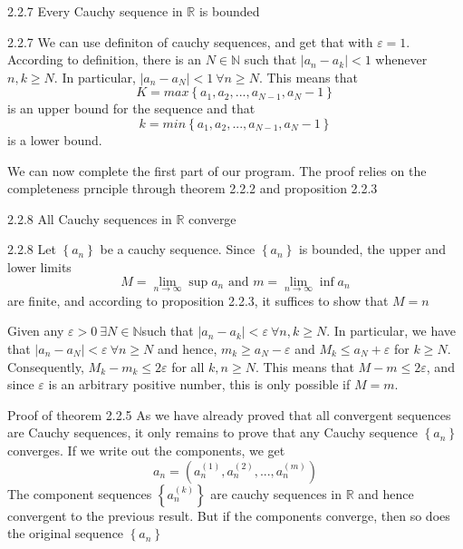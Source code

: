 \documentclass[a4paper,norsk]{article}
\renewcommand{\geq}{\geqslant}
\renewcommand{\leq}{\leqslant}
\renewcommand{\epsilon}{\varepsilon}
\begin{document}
\begin{lemmabox}{2.2.7}{}
Every Cauchy sequence in $ \mathbb{R} $ is bounded

\begin{proofbox}{2.2.7}{}
  We can use definiton of cauchy sequences, and get that with $ \epsilon =1 $. According to definition, there is an $ N \in \mathbb{N} $  such that $ \left| a_n - a_k  \right| < 1 $ whenever $ n, k \geq N $. In particular, $ \left| a_n - a_N \right| < 1 \: \forall n \geq N  $. This means that 
  \[
      K = max \left\{ a_1, a_2, ..., a_{N-1}, a_N -1  \right\} 
  \]
  is an upper bound for the sequence and that 
  \[
      k = min \left\{ a_1, a_2, ..., a_{N-1}, a_N -1  \right\} 
  \]
  is a lower bound.
  
\end{proofbox}
\end{lemmabox}

We can now complete the first part of our program. The proof relies on the completeness prnciple through theorem 2.2.2 and proposition 2.2.3

\begin{propositionbox}{2.2.8}{}
All Cauchy sequences in $ \mathbb{R} $ converge

\begin{proofbox}{2.2.8}{}
  Let $ \left\{ a_n \right\}  $ be a cauchy sequence. Since $ \left\{ a_n \right\}  $ is bounded, the upper and lower limits
  \[
      M = \lim_{n \to \infty } \sup a_n \text{ and } m = \lim_{n \to \infty } \inf a_n  
  \]
  are finite, and according to proposition 2.2.3, it suffices to show that $ M = n $
  
  Given any $ \epsilon >0 \: \exists N \in \mathbb{N} $such that $ \left| a_n - a_k \right| < \epsilon \: \forall n,k \geq N $. In particular, we have that $ \left| a_n - a_N \right| < \epsilon \: \forall n \geq N  $ and hence, $ m_k \geq a_N - \epsilon  $ and $ M_k \leq a_N + \epsilon  $   for $ k \geq N $. Consequently, $ M_k - m_k \leq 2 \epsilon  $ for all $ k,n \geq N $. This means that $ M - m \leq 2 \epsilon  $, and since $ \epsilon  $ is an arbitrary positive number, this is only possible if $ M =m $.
\end{proofbox}
\end{propositionbox}

\begin{proofbox}{Proof of theorem 2.2.5}{}
  As we have already proved that all convergent sequences are Cauchy sequences, it only remains to prove that any Cauchy sequence $ \left\{ a_n \right\}  $ converges. If we write out the components, we get
  \[
      a_n = \left( a_n^{(1)}, a_n^{(2)}, ..., a_n^{(m)} \right) 
  \]
  The component sequences $ \left\{ a_n^{(k)} \right\}  $ are cauchy sequences in $ \mathbb{R} $ and hence convergent to the previous result. But if the components converge, then so does the original sequence $ \left\{ a_n \right\}  $ 
\end{proofbox}
\end{document}
